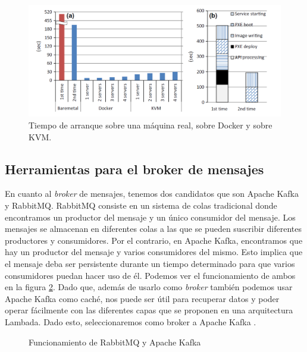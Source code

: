 \begin{figure}[htp]
\centering
\includegraphics[scale=0.40]{Imagenes/dockervsvm3.png}
\caption{Tiempo de arranque sobre una máquina real, sobre Docker y sobre
  KVM.}
\label{dock-3}
\end{figure}

\subsection{Herramientas para el broker de mensajes\label{hbrok}}

En cuanto al \emph{broker} de mensajes, tenemos dos candidatos que son
Apache Kafka y RabbitMQ. RabbitMQ consiste en un sistema de colas
tradicional donde encontramos un productor del mensaje y un único
consumidor del mensaje. Los mensajes se almacenan en diferentes colas
a las que se pueden suscribir diferentes productores y consumidores. Por
el contrario, en Apache Kafka, encontramos que hay un productor del
mensaje y varios consumidores del mismo. Esto implica que el mensaje
deba ser persistente durante un tiempo determinado para que varios
consumidores puedan hacer uso de él. Podemos ver el
funcionamiento de ambos en la figura \ref{brokers-img}. Dado que, además de
usarlo como \emph{broker} también podemos usar Apache Kafka como caché, nos
puede ser útil para recuperar datos y poder operar fácilmente con las
diferentes capas que se proponen en una arquitectura Lambada. Dado esto,
seleccionaremos como broker a Apache Kafka \cite{Hrr-2}.

\begin{figure}[htp]
\centering
{}
\caption{Funcionamiento de RabbitMQ y Apache Kafka}
\label{brokers-img}
\end{figure}

